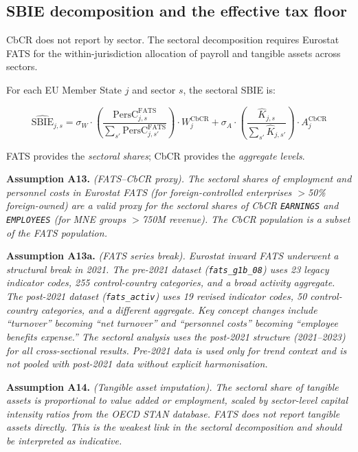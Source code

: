 \documentclass[11pt,a4paper]{article}
\newcommand{\EUR}{\texteuro}
\newcommand{\code}[1]{\texttt{#1}}
\newcommand{\assumption}[2]{\noindent\textbf{Assumption #1.} \textit{#2}\medskip}
\begin{document}
\subsection{SBIE decomposition and the effective tax floor}\label{sec:sbie_decomp}


CbCR does not report by sector. The sectoral decomposition requires Eurostat FATS for the within-jurisdiction allocation of payroll and tangible assets across sectors.

For each EU Member State $j$ and sector $s$, the sectoral SBIE is:

\begin{equation}\label{eq:sbie_sectoral}
\widehat{\text{SBIE}}_{j,s} = \sigma_W \cdot \left(\frac{\text{PersC}_{j,s}^{\text{FATS}}}{\sum_{s'} \text{PersC}_{j,s'}^{\text{FATS}}}\right) \cdot W_j^{\text{CbCR}} + \sigma_A \cdot \left(\frac{\hat{K}_{j,s}}{\sum_{s'} \hat{K}_{j,s'}}\right) \cdot A_j^{\text{CbCR}}
\end{equation}

FATS provides the \emph{sectoral shares}; CbCR provides the \emph{aggregate levels}.

\assumption{A13}{(FATS--CbCR proxy). The sectoral shares of employment and personnel costs in Eurostat FATS (for foreign-controlled enterprises $>$50\% foreign-owned) are a valid proxy for the sectoral shares of CbCR \code{EARNINGS} and \code{EMPLOYEES} (for MNE groups $>$\EUR750M revenue). The CbCR population is a subset of the FATS population.}

\assumption{A13a}{(FATS series break). Eurostat inward FATS underwent a structural break in 2021. The pre-2021 dataset (\code{fats\_g1b\_08}) uses 23 legacy indicator codes, 255 control-country categories, and a broad activity aggregate. The post-2021 dataset (\code{fats\_activ}) uses 19 revised indicator codes, 50 control-country categories, and a different aggregate. Key concept changes include ``turnover'' becoming ``net turnover'' and ``personnel costs'' becoming ``employee benefits expense.'' The sectoral analysis uses the post-2021 structure (2021--2023) for all cross-sectional results. Pre-2021 data is used only for trend context and is not pooled with post-2021 data without explicit harmonisation.}

\assumption{A14}{(Tangible asset imputation). The sectoral share of tangible assets is proportional to value added or employment, scaled by sector-level capital intensity ratios from the OECD STAN database. FATS does not report tangible assets directly. This is the weakest link in the sectoral decomposition and should be interpreted as indicative.}
\end{document}
